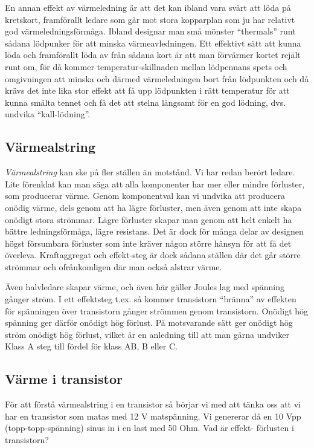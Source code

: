 En annan effekt av värmeledning är att det kan ibland vara svårt att löda på
kretskort, framförallt ledare som går mot stora kopparplan som ju har relativt
god värmeledningsförmåga. Ibland designar man små mönster ``thermals'' runt
sådana lödpunker för att minska värmeavledningen. Ett effektivt sätt att
kunna löda och framförallt löda av från sådana kort är att man förvärmer kortet
rejält runt om, för då kommer temperatur-skillnaden mellan lödpennans spets
och omgivningen att minska och därmed värmeledningen bort från lödpunkten och
då krävs det inte lika stor effekt att få upp lödpunkten i rätt temperatur för
att kunna smälta tennet och få det att stelna långsamt för en god lödning, dvs.
undvika ``kall-lödning''.

\subsection{Värmealstring}

\emph{Värmealstring} kan ske på fler ställen än motstånd. Vi har redan berört
ledare. Lite förenklat kan man säga att alla komponenter har mer eller mindre
förluster, som producerar värme. Genom komponentval kan vi undvika att
producera onödig värme, dels genom att ha lägre förluster, men även genom att
inte skapa onödigt stora strömmar. Lägre förluster skapar man genom att helt
enkelt ha bättre ledningsförmåga, lägre resistans. Det är dock för många
delar av designen högst försumbara förluster som inte kräver någon större
hänsyn för att få det överleva. Kraftaggregat och effekt-steg är dock sådana
ställen där det går större strömmar och ofrånkomligen där man också alstrar
värme.

Även halvledare skapar värme, och även här gäller Joules lag med spänning
gånger ström. I ett effektsteg t.ex. så kommer transistorn ``bränna'' av
effekten för spänningen över transistorn gånger strömmen genom transistorn.
Onödigt hög spänning ger därför onödigt hög förlust. På motsvarande sätt ger
onödigt hög ström onödigt hög förlust, vilket är en anledning till att man
gärna undviker Klass A steg till fördel för klass AB, B eller C.

\subsection{Värme i transistor}

För att förstå värmealstring i en transistor så börjar vi med att tänka oss
att vi har en transistor som matas med 12 V matspänning. Vi genererar då en
10 Vpp (topp-topp-spänning) sinus in i en last med 50 Ohm. Vad är effekt-
förlusten i transistorn?

